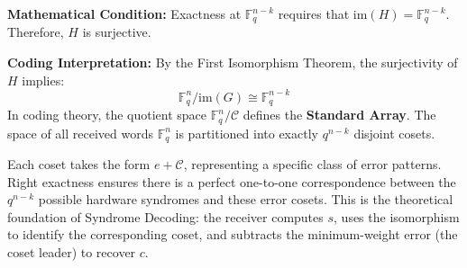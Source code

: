 \documentclass[11pt, a4paper, twoside]{article}
\newcommand{\F}{\mathbb{F}}
\newcommand{\C}{\mathcal{C}}
\newcommand{\im}{\text{im}}
\begin{document}
	\vspace{1em}
	
	\begin{conceptbox}
		\textbf{Mathematical Condition:} Exactness at $\F_q^{n-k}$ requires that $\im(H) = \F_q^{n-k}$. Therefore, $H$ is surjective.
		
		\textbf{Coding Interpretation:} 
		By the First Isomorphism Theorem, the surjectivity of $H$ implies:
		$$ \F_q^n / \im(G) \cong \F_q^{n-k} $$
		In coding theory, the quotient space $\F_q^n / \C$ defines the \textbf{Standard Array}. The space of all received words $\F_q^n$ is partitioned into exactly $q^{n-k}$ disjoint cosets. 
		
		Each coset takes the form $e + \C$, representing a specific class of error patterns. Right exactness ensures there is a perfect one-to-one correspondence between the $q^{n-k}$ possible hardware syndromes and these error cosets. This is the theoretical foundation of Syndrome Decoding: the receiver computes $s$, uses the isomorphism to identify the corresponding coset, and subtracts the minimum-weight error (the coset leader) to recover $c$.
	\end{conceptbox}
	
\end{document}
